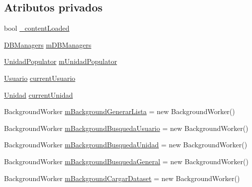 \subsection*{Atributos privados}
\begin{DoxyCompactItemize}
\item 
bool \hyperlink{class_proyecto___integrador__3_1_1_reportes_1_1_reporte_frecuencia_de_uso_aa546d5da9ab7be129b6d02180509f430}{\-\_\-content\-Loaded}
\item 
\hyperlink{class_proyecto___integrador__3_1_1_d_b_managers}{D\-B\-Managers} \hyperlink{class_proyecto___integrador__3_1_1_reportes_1_1_reporte_frecuencia_de_uso_a8d158836625cf21ca7515c256ec7bda2}{m\-D\-B\-Managers}
\item 
\hyperlink{_reporte_frecuencia_de_uso_8xaml_8cs_ac5564ac60b2bb0e1b9439f27d31948ac}{Unidad\-Populator} \hyperlink{class_proyecto___integrador__3_1_1_reportes_1_1_reporte_frecuencia_de_uso_a91106ba7bf23e61d729bc0399ef5fa98}{m\-Unidad\-Populator}
\item 
\hyperlink{class_proyecto___integrador__3_1_1_tipos_dato_1_1_usuario}{Usuario} \hyperlink{class_proyecto___integrador__3_1_1_reportes_1_1_reporte_frecuencia_de_uso_ad32fba0c33dc851eee94df8e83afb5f3}{current\-Usuario}
\item 
\hyperlink{class_proyecto___integrador__3_1_1_tipos_dato_1_1_unidad}{Unidad} \hyperlink{class_proyecto___integrador__3_1_1_reportes_1_1_reporte_frecuencia_de_uso_a518c39e6486c8e68350a36322f04a4ad}{current\-Unidad}
\item 
Background\-Worker \hyperlink{class_proyecto___integrador__3_1_1_reportes_1_1_reporte_frecuencia_de_uso_a131fca07c9b7c921f201e4b45a634ca5}{m\-Background\-Generar\-Lista} = new Background\-Worker()
\item 
Background\-Worker \hyperlink{class_proyecto___integrador__3_1_1_reportes_1_1_reporte_frecuencia_de_uso_a722de2d89e3789161b58c1f56bce02cd}{m\-Background\-Busqueda\-Usuario} = new Background\-Worker()
\item 
Background\-Worker \hyperlink{class_proyecto___integrador__3_1_1_reportes_1_1_reporte_frecuencia_de_uso_a411c812e105cbc256ea0100a5a482180}{m\-Background\-Busqueda\-Unidad} = new Background\-Worker()
\item 
Background\-Worker \hyperlink{class_proyecto___integrador__3_1_1_reportes_1_1_reporte_frecuencia_de_uso_af1330b4734c90167f8359a46e027b2ae}{m\-Background\-Busqueda\-General} = new Background\-Worker()
\item 
Background\-Worker \hyperlink{class_proyecto___integrador__3_1_1_reportes_1_1_reporte_frecuencia_de_uso_aea2b091673c31936e12f6b48128d94c2}{m\-Background\-Cargar\-Dataset} = new Background\-Worker()

\end{DoxyCompactItemize}
